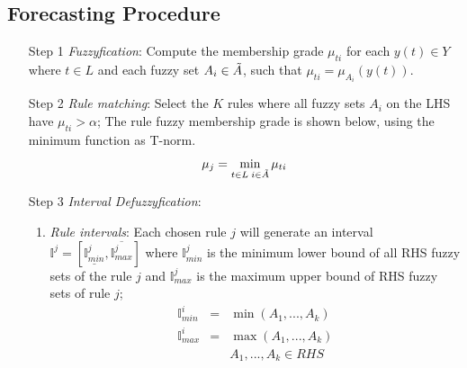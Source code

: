 \subsection{Forecasting Procedure}  
\label{sec:ifts_forecasting_procedure}

\begin{enumerate}
\item [Step 1] \textit{Fuzzyfication}: Compute the membership grade $\mu_{ti}$ for each $y(t) \in Y$ where $t \in L$ and each fuzzy set $A_i \in \Tilde{A}$, such that $\mu_{ti} = \mu_{A_i}(y(t))$. 
\item [Step 2] \textit{Rule matching}: Select the $K$ rules where all fuzzy sets $A_i$ on the LHS have $\mu_{ti} > \alpha$; The rule fuzzy membership grade is shown below, using the minimum function as T-norm.
\begin{equation}
    \mu_j = \min_{t\in L\; i \in \Tilde{A}} \mu_{ti}
\end{equation}
\item [Step 3] \textit{Interval Defuzzyfication}:
\begin{enumerate}
\item \textit{Rule intervals}: Each chosen rule $j$ will generate an interval $\mathbb{I}^j = [\underline{\mathbb{I}^j_{min}}, \overline{\mathbb{I}^j_{max}}]$ where $\mathbb{I}^j_{min}$ is the minimum lower bound of all RHS fuzzy sets of the rule $j$ and $\mathbb{I}^j_{max}$ is the maximum upper bound of RHS fuzzy sets of rule $j$;
\begin{equation}
\begin{array}{lcr}
\mathbb{I}^i_{min} & = & \min( A_1, ..., A_k ) \\
\mathbb{I}^i_{max} & = & \max( A_1, ..., A_k ) \\ 
& & A_1, ..., A_k \in RHS 
\end{array}
\label{eqn:iminimax}
\end{equation}


\end{enumerate}
\end{enumerate}
